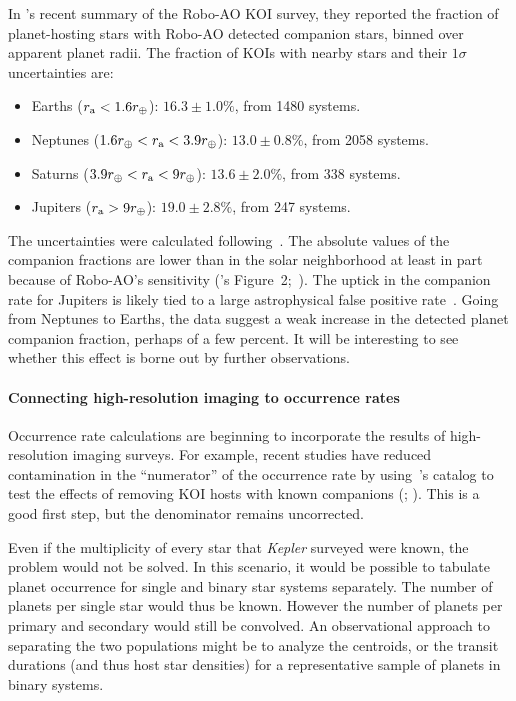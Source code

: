 \documentclass[12pt,modern]{aastex61}
\renewcommand{\a}{_{\rm a}}
\begin{document}
In \citet{ziegler_robo-ao_2017}'s recent summary of the Robo-AO KOI
survey, they reported the fraction of planet-hosting stars with
Robo-AO detected companion stars, binned over apparent planet radii.
The fraction of KOIs with nearby stars and their $1\sigma$
uncertainties are:
\begin{itemize}
    \item Earths ($r\a < 1.6r_\oplus$): $16.3 \pm 1.0\%$, from 1480
    systems.
    \item Neptunes ($1.6r_\oplus < r\a < 3.9 r_\oplus$): $13.0 \pm
    0.8\%$, from 2058 systems.
    \item Saturns ($3.9r_\oplus < r\a < 9 r_\oplus$): $13.6 \pm 2.0\%$, from 338 systems. 
    \item Jupiters ($r\a > 9r_\oplus$): $19.0 \pm 2.8\%$, from 247 systems. 
\end{itemize} 
The uncertainties were calculated
following~\citet{burgasser_binarity_2003}.  The absolute values of the
companion fractions are lower than in the solar neighborhood at
least in part because of Robo-AO's sensitivity
(\citealt{ziegler_robo-ao_2017}'s
Figure~2;~\citealt{raghavan_survey_2010}).
The uptick in the companion rate for Jupiters is likely tied to a
large astrophysical false positive rate~\citep{santerne_sophie_2012}.
Going from Neptunes to Earths, the data suggest a weak increase in the
detected planet companion fraction, perhaps of a few percent.  It will
be interesting to see whether this effect is borne out by further
observations.


\paragraph{Connecting high-resolution imaging to occurrence rates}

Occurrence rate calculations are beginning to incorporate the results
of high-resolution imaging surveys.  For example, recent studies have
reduced contamination in the ``numerator'' of the occurrence rate by
using~\citet{furlan_kepler_2017}'s catalog to test the effects of
removing KOI hosts with known companions
(\citealt{fulton_california-_2017}; \citealt{petigura_CKS_2017}).
This is a good first step, but the denominator remains uncorrected.  

Even if the multiplicity of every star that {\it Kepler} surveyed were
known, the problem would not be solved. In this scenario, it would be
possible to tabulate planet occurrence for single and binary star
systems separately.  The number of planets per single star would thus
be known.  However the number of planets per primary and secondary
would still be convolved.  An observational approach to
separating the two populations might be to analyze the centroids, or the transit
durations (and thus host star densities)
for a representative sample of planets in binary systems. 
\end{document}
